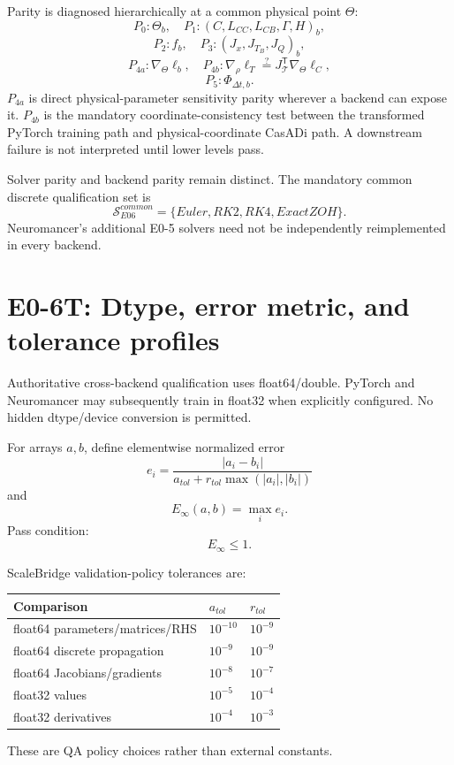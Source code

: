 \documentclass[11pt]{article}
\newcommand{\Einf}{E_{\infty}}
\begin{document}
Parity is diagnosed hierarchically at a common physical point $\Theta$:
\[
P_0:\Theta_b,
\quad
P_1:(C,L_{CC},L_{CB},\Gamma,H)_b,
\]
\[
P_2:f_b,
\quad
P_3:(J_x,J_{T_B},J_Q)_b,
\]
\[
P_{4a}:\nabla_\Theta\ell_b,
\quad
P_{4b}:\nabla_\rho\ell_T
\overset{?}{=}J_{\mathcal T}^{\mathsf T}\nabla_\Theta\ell_C,
\]
\[
P_5:\Phi_{\Delta t,b}.
\]
$P_{4a}$ is direct physical-parameter sensitivity parity wherever a backend can
expose it. $P_{4b}$ is the mandatory coordinate-consistency test between the
transformed PyTorch training path and physical-coordinate CasADi path.
A downstream failure is not interpreted until lower levels pass.

Solver parity and backend parity remain distinct. The mandatory common discrete
qualification set is
\[
\boxed{\mathcal S_{E06}^{common}=\{Euler,RK2,RK4,ExactZOH\}.}
\]
Neuromancer's additional E0-5 solvers need not be independently reimplemented
in every backend.

\section{E0-6T: Dtype, error metric, and tolerance profiles}

Authoritative cross-backend qualification uses float64/double. PyTorch and
Neuromancer may subsequently train in float32 when explicitly configured.
No hidden dtype/device conversion is permitted.

For arrays $a,b$, define elementwise normalized error
\[
e_i=\frac{|a_i-b_i|}{a_{tol}+r_{tol}\max(|a_i|,|b_i|)}
\]
and
\[
\boxed{\Einf(a,b)=\max_i e_i.}
\]
Pass condition:
\[
\boxed{\Einf\le1.}
\]

ScaleBridge validation-policy tolerances are:
\begin{center}
\begin{tabular}{lll}
\toprule
Comparison & $a_{tol}$ & $r_{tol}$\\
\midrule
float64 parameters/matrices/RHS & $10^{-10}$ & $10^{-9}$\\
float64 discrete propagation & $10^{-9}$ & $10^{-9}$\\
float64 Jacobians/gradients & $10^{-8}$ & $10^{-7}$\\
float32 values & $10^{-5}$ & $10^{-4}$\\
float32 derivatives & $10^{-4}$ & $10^{-3}$\\
\bottomrule
\end{tabular}
\end{center}
These are QA policy choices rather than external constants.
\end{document}
